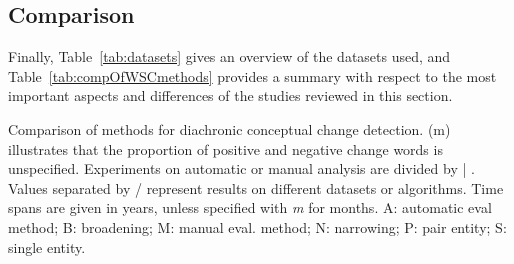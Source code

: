 \documentclass[output=paper]{langsci/langscibook}
\begin{document}
\subsection{Comparison}\label{subs:comparison}

Finally, Table~\ref{tab:datasets} gives an overview of the datasets used, and Table~\ref{tab:compOfWSCmethods} provides a summary with respect to the most important aspects and differences of the studies reviewed in this section. 


\begin{table}
\caption{Comparison of methods for diachronic conceptual change detection. (m) illustrates that the proportion of positive and negative change words is unspecified. Experiments on automatic or manual analysis are divided by | .  Values separated by / represent results on different datasets or algorithms. Time spans are given in years, unless specified with \textit{m} for months. A: automatic eval method; B: broadening; M: manual eval. method; N: narrowing; P: pair entity; S: single entity.}\label{tab:compOfWSCmethods}


\end{table}
\end{document}
